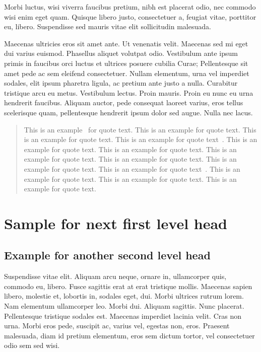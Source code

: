 \documentclass[AMS,STIX2COL]{WileyNJD-v2}
\begin{document}
    Morbi luctus, wisi viverra faucibus pretium, nibh est placerat odio, nec commodo wisi enim eget quam. Quisque
    libero justo, consectetuer a, feugiat vitae, porttitor eu, libero. Suspendisse sed mauris vitae elit sollicitudin malesuada.

    Maecenas ultricies eros sit amet ante. Ut venenatis velit. Maecenas sed mi eget dui varius euismod. Phasellus aliquet
    volutpat odio. Vestibulum ante ipsum primis in faucibus orci luctus et ultrices posuere cubilia Curae; Pellentesque sit
    amet pede ac sem eleifend consectetuer. Nullam elementum, urna vel imperdiet sodales, elit ipsum pharetra ligula,
    ac pretium ante justo a nulla. Curabitur tristique arcu eu metus. Vestibulum lectus. Proin mauris. Proin eu nunc eu
    urna hendrerit faucibus. Aliquam auctor, pede consequat laoreet varius, eros tellus scelerisque quam, pellentesque
    hendrerit ipsum dolor sed augue. Nulla nec lacus.

    \begin{quote}
        This is an example~\citep{Elbaum2002,Blanchard2015} for quote text. This is an example for quote text. This is an example for quote text. This is an example for quote text~\cite{Blanchard2015}. This is an example for quote text. This is an example for quote text. This is an example for quote text. This is an example for quote text. This is an example for quote text. This is an example for quote text~\cite{Blanchard2015}. This is an example for quote text. This is an example for quote text. This is an example for quote text.
    \end{quote}


    \section{Sample for next first level head}\label{sec3}

    \subsection{Example for another second level head}

    Suspendisse vitae elit. Aliquam arcu neque, ornare in, ullamcorper quis, commodo eu, libero. Fusce sagittis erat at
    erat tristique mollis. Maecenas sapien libero, molestie et, lobortis in, sodales eget, dui. Morbi ultrices rutrum lorem.
    Nam elementum ullamcorper leo. Morbi dui. Aliquam sagittis. Nunc placerat. Pellentesque tristique sodales est.
    Maecenas imperdiet lacinia velit. Cras non urna. Morbi eros pede, suscipit ac, varius vel, egestas non, eros. Praesent
    malesuada, diam id pretium elementum, eros sem dictum tortor, vel consectetuer odio sem sed wisi.
\end{document}
